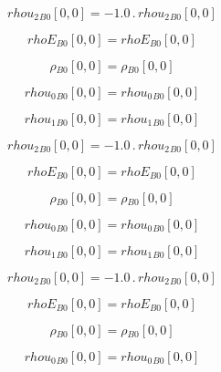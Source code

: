 \documentclass{article}
\begin{document}
\begin{dmath}{rhou_{2}{_{B0}}}[{0,0}] = - 1.0 \,.\, {rhou_{2}{_{B0}}}[{0,0}]\end{dmath}

\begin{dmath}{rhoE{_{B0}}}[{0,0}] = {rhoE{_{B0}}}[{0,0}]\end{dmath}

\begin{dmath}{\rho{_{B0}}}[{0,0}] = {\rho{_{B0}}}[{0,0}]\end{dmath}

\begin{dmath}{rhou_{0}{_{B0}}}[{0,0}] = {rhou_{0}{_{B0}}}[{0,0}]\end{dmath}

\begin{dmath}{rhou_{1}{_{B0}}}[{0,0}] = {rhou_{1}{_{B0}}}[{0,0}]\end{dmath}

\begin{dmath}{rhou_{2}{_{B0}}}[{0,0}] = - 1.0 \,.\, {rhou_{2}{_{B0}}}[{0,0}]\end{dmath}

\begin{dmath}{rhoE{_{B0}}}[{0,0}] = {rhoE{_{B0}}}[{0,0}]\end{dmath}

\begin{dmath}{\rho{_{B0}}}[{0,0}] = {\rho{_{B0}}}[{0,0}]\end{dmath}

\begin{dmath}{rhou_{0}{_{B0}}}[{0,0}] = {rhou_{0}{_{B0}}}[{0,0}]\end{dmath}

\begin{dmath}{rhou_{1}{_{B0}}}[{0,0}] = {rhou_{1}{_{B0}}}[{0,0}]\end{dmath}

\begin{dmath}{rhou_{2}{_{B0}}}[{0,0}] = - 1.0 \,.\, {rhou_{2}{_{B0}}}[{0,0}]\end{dmath}

\begin{dmath}{rhoE{_{B0}}}[{0,0}] = {rhoE{_{B0}}}[{0,0}]\end{dmath}

\begin{dmath}{\rho{_{B0}}}[{0,0}] = {\rho{_{B0}}}[{0,0}]\end{dmath}

\begin{dmath}{rhou_{0}{_{B0}}}[{0,0}] = {rhou_{0}{_{B0}}}[{0,0}]\end{dmath}
\end{document}
